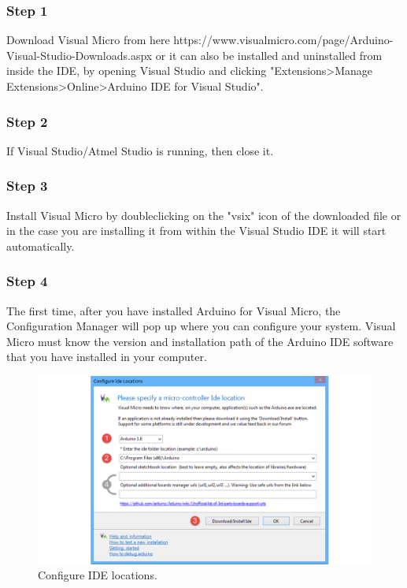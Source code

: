 \begin{refsection}
\subsubsection{Step 1}
Download Visual Micro from here https://www.visualmicro.com/page/Arduino-Visual-Studio-Downloads.aspx or it can also be installed and uninstalled from inside the IDE, by opening Visual Studio and clicking "Extensions>Manage Extensions>Online>Arduino IDE for Visual Studio".

\subsubsection{Step 2}
If Visual Studio/Atmel Studio is running, then close it.

\subsubsection{Step 3}
Install Visual Micro by doubleclicking on the "vsix" icon of the downloaded file or in the case you are installing it from within the Visual Studio IDE it will start automatically.

\subsubsection{Step 4}

The first time, after you have installed Arduino for Visual Micro, the Configuration Manager will pop up where you can configure your system. Visual Micro must know the version and installation path of the Arduino IDE software that you have installed in your computer.

\begin{figure}[H]
	\centering
	\includegraphics[width=1\linewidth]{./sdf/arduino_quantum_rx/figures/configureIDE.pdf}
	\caption{Configure IDE locations.}
	\label{configureIDE}
\end{figure}


\end{refsection}
